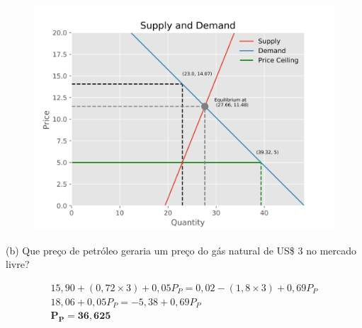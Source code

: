 \documentclass[12pt]{article}
\begin{document}
\begin{figure}[H]
    \includegraphics{curve.png}
\end{figure}

(b) Que preço de petróleo geraria um preço do gás natural de US\$ 3 no mercado livre?

\begin{gather*}
    15,90 + (0,72 \times 3) + 0,05P_P = 0,02 - (1,8 \times 3) + 0,69P_P \\
    18,06 + 0,05P_P = -5,38 + 0,69P_P \\
    \bm{P_P = 36,625}
\end{gather*}
\end{document}
